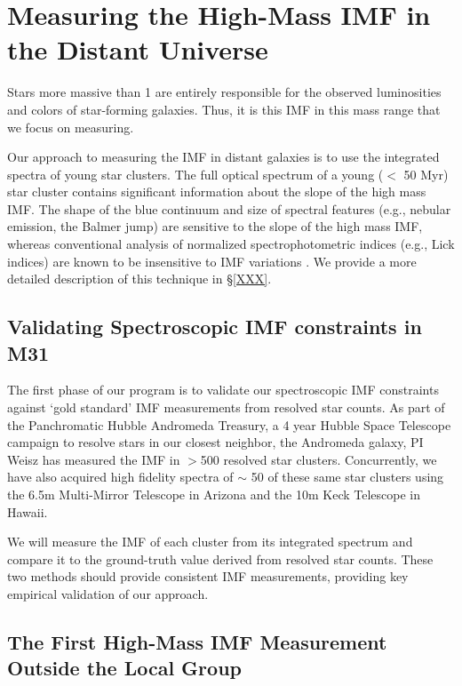 \documentclass[11pt,preprint]{aastex}
\begin{document}
\section{Measuring the High-Mass IMF in the Distant Universe}

Stars more massive than 1 \msun are entirely responsible for the observed luminosities and colors of star-forming galaxies.  Thus, it is this IMF in this mass range that we focus on measuring.  

Our approach to measuring the IMF in distant galaxies is to use the integrated spectra of young star clusters. The full optical spectrum of a young ($<$ 50 Myr) star cluster contains significant information about the slope of the high mass IMF.  The shape of the blue continuum and size of spectral features (e.g., nebular emission, the Balmer jump) are sensitive to the slope of the high mass IMF, whereas conventional analysis of normalized spectrophotometric indices (e.g., Lick indices) are known to be insensitive to IMF variations \citep[e.g.,][]{kol08}.  We provide a more detailed description of this technique in \S \ref{XXX}.  

\subsection{Validating Spectroscopic IMF constraints in M31}

The first phase of our program is to validate our spectroscopic IMF constraints against `gold standard' IMF measurements from resolved star counts.  As part of the Panchromatic Hubble Andromeda Treasury, a 4 year Hubble Space Telescope campaign to resolve stars in our closest neighbor, the Andromeda galaxy, PI Weisz has measured the IMF in $>$500 resolved star clusters.  Concurrently, we have also acquired high fidelity spectra of $\sim$ 50 of these same star clusters using the 6.5m Multi-Mirror Telescope in Arizona and the 10m Keck Telescope in Hawaii.  

We will measure the IMF of each cluster from its integrated spectrum and compare it to the ground-truth value derived from resolved star counts.  These two methods should provide consistent IMF measurements, providing key empirical validation of our approach.


\subsection{The First High-Mass IMF Measurement Outside the Local Group}
\end{document}
